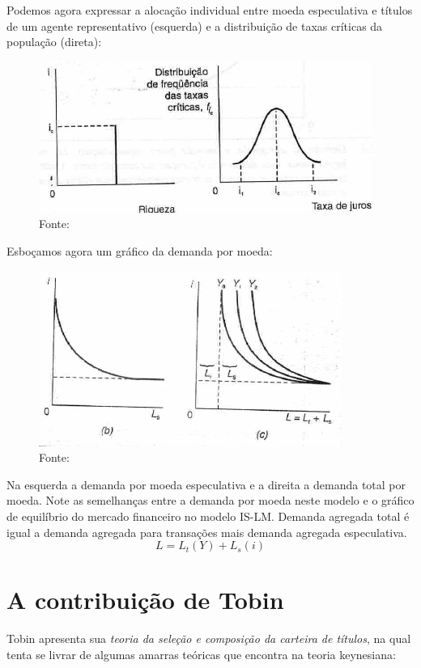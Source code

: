 \documentclass[12pt,a4paper,oneside,brazil]{abntex2}
\begin{document}
Podemos agora expressar a alocação individual entre moeda especulativa e títulos de um agente representativo (esquerda) e a distribuição de taxas críticas da população (direta):
\begin{figure}[h]
\includegraphics[scale=1]{Decisoes individuais.PNG}
\centering
\caption{Fonte: \cite[p. 77]{rossetti98}}
\end{figure}

Esboçamos agora um gráfico da demanda por moeda:

\begin{figure}
\includegraphics[scale=1]{MD.PNG}
\centering
\caption{Fonte: \cite[p. 79]{rossetti98}}
\end{figure}

Na esquerda a demanda por moeda especulativa e a direita a demanda total por moeda. Note as semelhanças entre a demanda por moeda neste modelo e o gráfico de equilíbrio do mercado financeiro no modelo IS-LM. Demanda agregada total é igual a demanda agregada para transações mais demanda agregada especulativa.
\[ L = L_t(Y) + L_s(i)\]

\section{A contribuição de Tobin}
Tobin apresenta sua \emph{teoria da seleção e composição da carteira de títulos}, na qual tenta se livrar de algumas amarras teóricas que encontra na teoria keynesiana:
\end{document}
